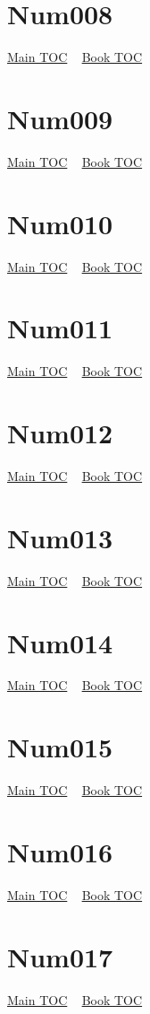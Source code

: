\documentclass{book}
\begin{document}
  \section{Num008}\hyperlink{toc}{Main TOC} ~ \hyperref[subsec:Num]{Book TOC} 
  \section{Num009}\hyperlink{toc}{Main TOC} ~ \hyperref[subsec:Num]{Book TOC} 
  \section{Num010}\hyperlink{toc}{Main TOC} ~ \hyperref[subsec:Num]{Book TOC} 
  \section{Num011}\hyperlink{toc}{Main TOC} ~ \hyperref[subsec:Num]{Book TOC} 
  \section{Num012}\hyperlink{toc}{Main TOC} ~ \hyperref[subsec:Num]{Book TOC} 
  \section{Num013}\hyperlink{toc}{Main TOC} ~ \hyperref[subsec:Num]{Book TOC} 
  \section{Num014}\hyperlink{toc}{Main TOC} ~ \hyperref[subsec:Num]{Book TOC} 
  \section{Num015}\hyperlink{toc}{Main TOC} ~ \hyperref[subsec:Num]{Book TOC} 
  \section{Num016}\hyperlink{toc}{Main TOC} ~ \hyperref[subsec:Num]{Book TOC} 
  \section{Num017}\hyperlink{toc}{Main TOC} ~ \hyperref[subsec:Num]{Book TOC} 
\end{document}
